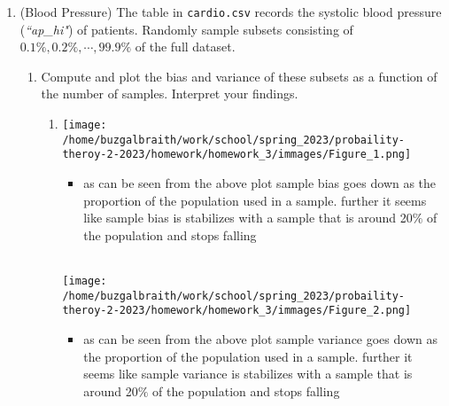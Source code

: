 \documentclass[12pt,twoside]{article}
\begin{document}
\begin{enumerate}
\begin{enumerate}
\newpage
\end{enumerate}
\item (Blood Pressure) The table in \texttt{cardio.csv} records the systolic blood pressure (\textit{``ap\_hi"}) of patients. Randomly sample subsets consisting of $0.1\%, 0.2\%, \cdots, 99.9\%$ of the full dataset. 
\begin{enumerate}
\item Compute and plot the bias and variance of these subsets as a function of the number of samples. Interpret your findings.
\begin{enumerate} 
    \item \texttt{[image: /home/buzgalbraith/work/school/spring\_2023/probaility-theroy-2-2023/homework/homework\_3/immages/Figure\_1.png]}
    \begin{itemize}
        \item as can be seen from the above plot sample bias goes down as the proportion of the population used in a sample. further it seems like sample bias is stabilizes with a sample that is around 20$\%$ of the population and stops falling
    \end{itemize} 
    \\ \texttt{[image: /home/buzgalbraith/work/school/spring\_2023/probaility-theroy-2-2023/homework/homework\_3/immages/Figure\_2.png]}
        \begin{itemize}
                \item as can be seen from the above plot sample variance goes down as the proportion of the population used in a sample. further it seems like sample variance is stabilizes with a sample that is around 20$\%$ of the population and stops falling
    \end{itemize}
\end{enumerate}



\end{enumerate}
\end{enumerate}
\end{document}
